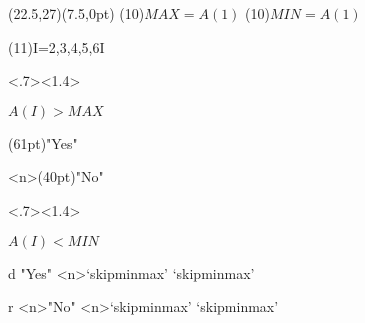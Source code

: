 \begin{caprm}
\begin{nagarezu}(22.5\zw,27\baselineskip)(7.5\zw,0pt)
  \downto
  \opbox(10\zw){$MAX=A(1)$}
  \opbox(10\zw){$MIN=A(1)$}
  \downto
  \begin{kurikaesi}(11\zw){I=2,3,4,5,6}{I}
    \downto
    \begin{ifbox}<.7><1.4>{\strut$A(I)>MAX$}
      \begin{sitabunki}
        \downto(61pt)"Yes"
        \downto[skipminmax]
        \pushcurrentP
      \end{sitabunki}
      \begin{migibunki}
        \rightto<n>(40pt)"No"
        \downto
        \begin{ifbox}<.7><1.4>{\strut$A(I)<MIN$}
          \begin{branch}{d}
            \downto"Yes"
            \downto<n>`skipminmax'
            \leftto`skipminmax'
            \pushcurrentP
          \end{branch}%
          \begin{branch}{r}
            \rightto<n>"No"
            \downto<n>`skipminmax'
            \leftto`skipminmax'
          \end{branch}
        \end{ifbox}
      \end{migibunki}
    \end{ifbox}
  \end{kurikaesi}
  \downto
  \downto
\end{nagarezu}%
\end{caprm}
